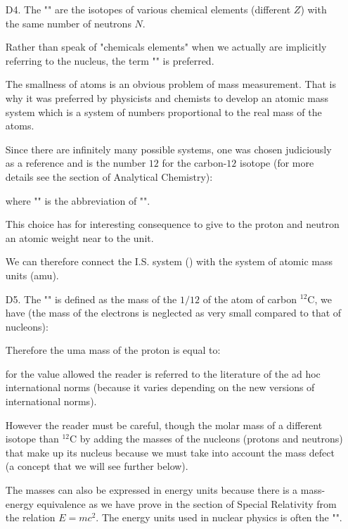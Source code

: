 \begin{enumerate}
		\item[D4.] The "" are the isotopes of various chemical elements (different $Z$) with the same number of neutrons $N$.
		
		 Rather than speak of "chemicals elements" when we actually are implicitly referring to the nucleus, the term "" is preferred.
		 
		 The smallness of atoms is an obvious problem of mass measurement. That is why it was preferred by physicists and chemists to develop an atomic mass system which is a system of numbers proportional to the real mass of the atoms.
		 
		 Since there are infinitely many possible systems, one was chosen judiciously as a reference and is the number $12$ for the carbon-$12$ isotope (for more details see the section of Analytical Chemistry):
		 
		where "" is the abbreviation of "".
		
		This choice has for interesting consequence to give to the proton and neutron an atomic weight near to the unit.
		
		We can therefore connect the I.S. system () with the system of atomic mass units (amu).
		
		\item[D5.] The "\label{atomic mass unit}" is defined as the mass of the $1/12$ of the atom of carbon ${}^{12}\mathrm{C}$, we have (the mass of the electrons is neglected as very small compared to that of nucleons):
		
		Therefore the uma mass of the proton is equal to:
		
		 for the value allowed the reader is referred to the literature of the ad hoc international norms (because it varies depending on the new versions of international norms).
		 
		However the reader must be careful, though the molar mass of a different isotope than ${}^{12}\mathrm{C}$ by adding the masses of the nucleons (protons and neutrons) that make up its nucleus because we must take into account the mass defect (a concept that we will see further below).
	
		The masses can also be expressed in energy units because there is a mass-energy equivalence as we have prove in the section of Special Relativity from the relation $E=mc^2$. The energy units used in nuclear physics is often the "".
	

\end{enumerate}
